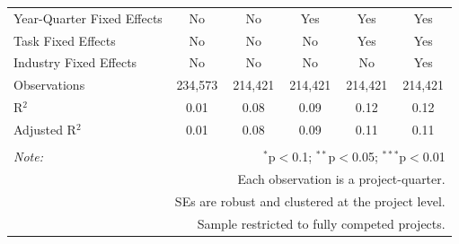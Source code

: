 \documentclass[
]{article}
\begin{document}
\begin{table}[H]
\begin{tabular}{@{\extracolsep{-2pt}}lccccc}
Year-Quarter Fixed Effects & No & No & Yes & Yes & Yes \\ 
Task Fixed Effects & No & No & No & Yes & Yes \\ 
Industry Fixed Effects & No & No & No & No & Yes \\ 
Observations & 234,573 & 214,421 & 214,421 & 214,421 & 214,421 \\ 
R$^{2}$ & 0.01 & 0.08 & 0.09 & 0.12 & 0.12 \\ 
Adjusted R$^{2}$ & 0.01 & 0.08 & 0.09 & 0.11 & 0.11 \\ 
\hline 
\hline \\[-1.8ex] 
\textit{Note:}  & \multicolumn{5}{r}{$^{*}$p$<$0.1; $^{**}$p$<$0.05; $^{***}$p$<$0.01} \\ 
 & \multicolumn{5}{r}{Each observation is a project-quarter.} \\ 
 & \multicolumn{5}{r}{SEs are robust and clustered at the project level.} \\ 
 & \multicolumn{5}{r}{Sample restricted to fully competed projects.} \\ 
\end{tabular} 
\end{table}
\end{document}
